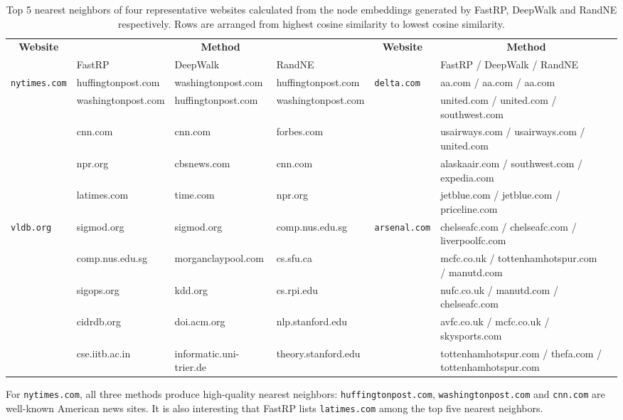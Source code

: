 \documentclass[11pt]{article}
\begin{document}
\begin{table}[H]
\centering
\caption{Top 5 nearest neighbors of four representative websites calculated from the node embeddings generated by FastRP, DeepWalk and RandNE respectively. Rows are arranged from highest cosine similarity to lowest cosine similarity.}
\label{tab:neighbors}
\small
\begin{tabular}{@{}lllllll@{}}
\toprule
\multicolumn{1}{c}{\textbf{Website}} & \multicolumn{3}{c}{\textbf{Method}} & \multicolumn{1}{c}{\textbf{Website}} & \multicolumn{2}{c}{\textbf{Method}} \\
\cmidrule(lr){2-4} \cmidrule(lr){6-7}
 & FastRP & DeepWalk & RandNE &  & FastRP / DeepWalk / RandNE & \\
\midrule
\texttt{nytimes.com} & huffingtonpost.com & washingtonpost.com & huffingtonpost.com & \texttt{delta.com} & aa.com / aa.com / aa.com & \\
 & washingtonpost.com & huffingtonpost.com & washingtonpost.com &  & united.com / united.com / southwest.com & \\
 & cnn.com & cnn.com & forbes.com &  & usairways.com / usairways.com / united.com & \\
 & npr.org & cbsnews.com & cnn.com &  & alaskaair.com / southwest.com / expedia.com & \\
 & latimes.com & time.com & npr.org &  & jetblue.com / jetblue.com / priceline.com & \\
\midrule
\texttt{vldb.org} & sigmod.org & sigmod.org & comp.nus.edu.sg & \texttt{arsenal.com} & chelseafc.com / chelseafc.com / liverpoolfc.com & \\
 & comp.nus.edu.sg & morganclaypool.com & cs.sfu.ca &  & mcfc.co.uk / tottenhamhotspur.com / manutd.com & \\
 & sigops.org & kdd.org & cs.rpi.edu &  & nufc.co.uk / manutd.com / chelseafc.com & \\
 & cidrdb.org & doi.acm.org & nlp.stanford.edu &  & avfc.co.uk / mcfc.co.uk / skysports.com & \\
 & cse.iitb.ac.in & informatic.uni-trier.de & theory.stanford.edu &  & tottenhamhotspur.com / thefa.com / tottenhamhotspur.com & \\
\bottomrule
\end{tabular}
\end{table}

For \texttt{nytimes.com}, all three methods produce high-quality nearest neighbors: \texttt{huffingtonpost.com}, \texttt{washingtonpost.com} and \texttt{cnn.com} are well-known American news sites. It is also interesting that FastRP lists \texttt{latimes.com} among the top five nearest neighbors.
\end{document}
